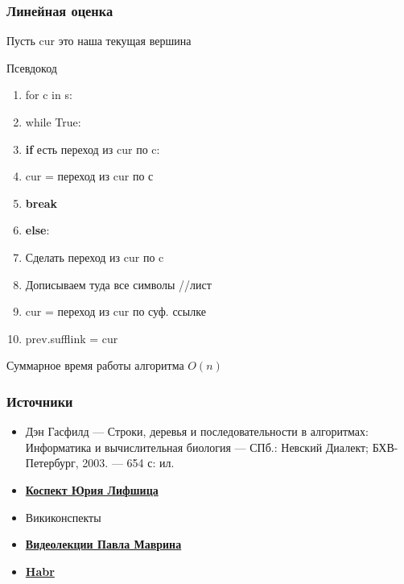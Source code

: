 \documentclass[t]{beamer}  %
\begin{document}
\begin{frame}
	\frametitle{Линейная оценка}
	Пусть cur это наша текущая вершина
	
	\begin{block}{Псевдокод}
		\pause
		\begin{enumerate}
			\item\color[RGB]{0,0, 255}for \color[RGB]{0,0,0} c in s:
			
			\pause
			\item \qquad \color[RGB]{0,0, 255}while \color[RGB]{0,0,0}True:
			
			\pause
			\item \qquad\qquad \textbf{if} есть переход из cur по c:
			
			\pause
			\item \qquad\qquad\qquad cur = переход из cur по с 
			
			\pause
			\item \qquad\qquad\qquad \textbf{break}
			
			\pause
			\item \qquad\qquad \textbf{else}:
			
			\pause
			\item \qquad\qquad\qquad Сделать переход из cur по c
			
			\pause
			\item \qquad\qquad\qquad Дописываем туда все символы	//лист
			
			\pause
			\item \qquad\qquad\qquad cur = переход из cur по суф. ссылке 
				
			\pause	
			\item \qquad\qquad\qquad prev.sufflink = cur 		
		\end{enumerate}
	\end{block}

	\pause
	Суммарное время работы алгоритма $O(n)$
\end{frame}

\begin{frame}
	\frametitle{Источники}
	
	\begin{itemize}
		\item Дэн Гасфилд — Строки, деревья и последовательности в алгоритмах: Информатика и вычислительная биология — СПб.: Невский Диалект; БХВ-Петербург, 2003. — 654 с: ил.
		
		\item \href{http://yury.name/internet/01ianote.pdf}{\textbf{Коспект Юрия Лифшица}}
		
		\item Викиконспекты
		
		\item \href{https://www.youtube.com/watch?v=LNBs3xZMGLc}{\textbf{Видеолекции Павла Маврина}}
		
		\item \href{https://habr.com/ru/post/111675/}{\textbf{Habr}}
	\end{itemize}	
\end{frame}
\end{document}

